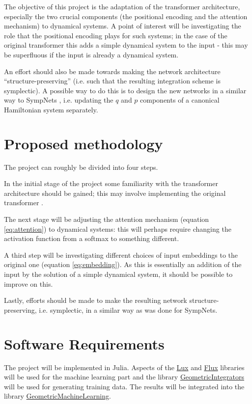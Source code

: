 \documentclass{article}
\begin{document}
The objective of this project is the adaptation of the transformer architecture, especially the two crucial components (the positional encoding and the attention mechanism) to dynamical systems. A point of interest will be investigating the role that the positional encoding plays for such systems; in the case of the original transformer this adds a simple dynamical system to the input - this may be superfluous if the input is already a dynamical system. 

An effort should also be made towards making the network architecture ``structure-preserving'' (i.e. such that the resulting integration scheme is symplectic). A possible way to do this is to design the new networks in a similar way to SympNets \cite{jin2020sympnets}, i.e. updating the $q$ and $p$ components of a canonical Hamiltonian system separately.  

\section{Proposed methodology}
The project can roughly be divided into four steps.

In the initial stage of the project some familiarity with the transformer architecture should be gained; this may involve implementing the original transformer \cite{vaswani2017attention}. 

The next stage will be adjusting the attention mechanism (equation \eqref{eq:attention}) to dynamical systems: this will perhaps require changing the activation function from a softmax to something different. 

A third step will be investigating different choices of input embeddings to the original one (equation \eqref{eq:embedding}). As this is essentially an addition of the input by the solution of a simple dynamical system, it should be possible to improve on this. 

Lastly, efforts should be made to make the resulting network structure-preserving, i.e. symplectic, in a similar way as was done for SympNets. 

\section{Software Requirements}

The project will be implemented in Julia. Aspects of the \href{https://github.com/LuxDL/Lux.jl}{Lux} \cite{pal2022lux} and \href{https://github.com/FluxML/Flux.jl}{Flux} \cite{Flux.jl-2018} libraries will be used for the machine learning part and the library \href{https://github.com/JuliaGNI/GeometricIntegrators.jl}{GeometricIntegrators} \cite{Kraus:2020:GeometricIntegrators} will be used for generating training data. The results will be integrated into the library \href{https://github.com/JuliaGNI/GeometricMachineLearning.jl}{GeometricMachineLearning}.


\printbibliography
\end{document}
